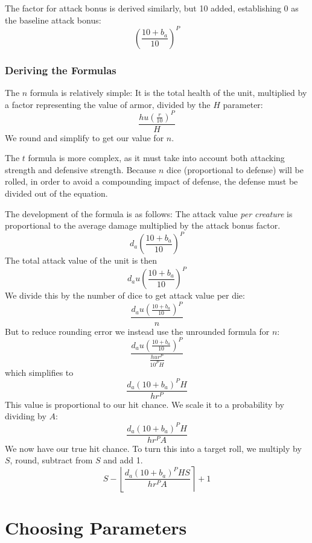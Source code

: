The factor for attack bonus is derived similarly,
but 10 added, establishing 0 as the baseline attack bonus:
\[
    \left(\frac{10 + b_a}{10}\right)^P
\]

\subsubsection{Deriving the Formulas}

The $n$ formula is relatively simple:
It is the total health of the unit,
multiplied by a factor representing the value of armor,
divided by the $H$ parameter:
\[
    \frac
        {h u (\frac{r}{10})^P}
        {H}
\]
We round and simplify to get our value for $n$.

The $t$ formula is more complex,
as it must take into account both attacking strength and defensive strength.
Because $n$ dice (proportional to defense) will be rolled,
in order to avoid a compounding impact of defense,
the defense must be divided out of the equation.

The development of the formula is as follows:
The attack value \emph{per creature} is proportional to
the average damage multiplied by the attack bonus factor.
\[
    d_a \left(\frac{10 + b_{a}}{10}\right)^{P}
\]
The total attack value of the unit is then
\[
    d_a u \left(\frac{10 + b_{a}}{10}\right)^{P}
\]
We divide this by the number of dice to get attack value per die:
\[
    \frac
        {d_a u \left(\frac{10 + b_{a}}{10}\right)^{P}}
        {n}
\]
But to reduce rounding error we instead use the unrounded formula for $n$:
\[
    \frac
        {d_a u \left(\frac{10 + b_{a}}{10}\right)^{P}}
        {\frac{h u r^P}{10^P H}}
\]
which simplifies to
\[
    \frac
        {d_a (10 + b_{a})^P H}
        {h r^P}
\]
This value is proportional to our hit chance.
We scale it to a probability by dividing by $A$:
\[
    \frac
        {d_a (10 + b_{a})^P H}
        {h r^P A}
\]
We now have our true hit chance.
To turn this into a target roll,
we multiply by $S$, round, subtract from $S$ and add 1.
\[
    S -
    \left\lfloor
        \frac
            {d_a (10 + b_{a})^P H S}
            {h r^P A}
    \right\rceil
    + 1
\]


\section{Choosing Parameters}\label{sec:params}

